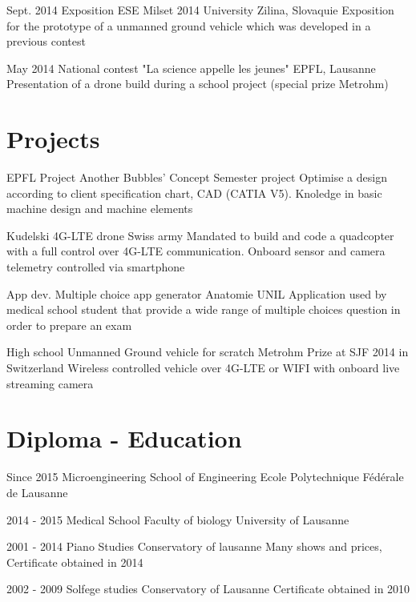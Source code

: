 \documentclass[]{friggeri-cv}
\begin{document}
	\begin{entrylist}
		
		\entry
		{Sept. 2014}
		{Exposition ESE Milset 2014}
		{University Zilina, Slovaquie}
		{Exposition for the prototype of a unmanned ground vehicle which was developed in a previous contest}
		
		\entry
		{May 2014}
		{National contest "La science appelle les jeunes"}
		{EPFL, Lausanne}
		{Presentation of a drone build during a school project (special prize Metrohm)}

	\end{entrylist}	
	\section{Projects}
	\begin{entrylist}
		\entry
		{EPFL Project}
		{Another Bubbles' Concept}
		{Semester project}
		{Optimise a design according to client specification chart, CAD (CATIA V5). Knoledge in basic machine design and machine elements}
		
		\entry
		{Kudelski}
		{4G-LTE drone}
		{Swiss army}
		{Mandated to build and code a quadcopter with a full control over 4G-LTE communication. Onboard sensor and camera telemetry controlled via smartphone}
		
		\entry
		{App dev.}
		{Multiple choice app generator}
		{Anatomie UNIL}
		{Application used by medical school student that provide a wide range of multiple choices question in order to prepare an exam}
		
		\entry
		{High school}
		{Unmanned Ground vehicle for scratch}
		{Metrohm Prize at SJF 2014 in Switzerland}
		{Wireless controlled vehicle over 4G-LTE or WIFI with onboard live streaming camera}
	\end{entrylist}
	
	\section{Diploma - Education}
	
	\begin{entrylist}
		
		\entry
		{Since 2015}
		{Microengineering}
		{School of Engineering}
		{Ecole Polytechnique Fédérale de Lausanne}
		
		\entry
		{2014 - 2015}
		{Medical School}
		{Faculty of biology}
		{University of Lausanne}
		
		\entry
		{2001 - 2014}
		{Piano Studies}
		{Conservatory of lausanne}
		{Many shows and prices, Certificate obtained in 2014}
		
		\entry
		{2002 - 2009}
		{Solfege studies}
		{Conservatory of Lausanne}
		{Certificate obtained in 2010}
		
	\end{entrylist}
	
\end{document}
